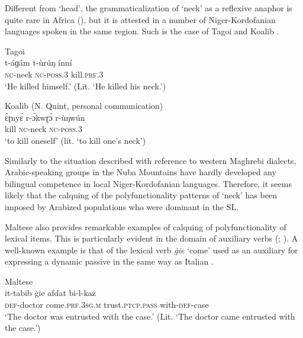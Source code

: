 \documentclass[output=paper]{langsci/langscibook}
\begin{document}
Different from ‘head’, the grammaticalization of ‘neck’ as a reflexive anaphor is quite rare in Africa (\citealt[50]{Heine2011}), but it is attested in a number of Niger-Kordofanian languages spoken in the same region. Such is the case of Tagoi  and Koalib . 

\ea\label{21}
{Tagoi \citep[26]{Alamin2015}}\\
\gll   t-áɡám t-ùrúŋ ínní\\
       \textsc{nc}-neck \textsc{nc}-\textsc{poss.3} kill.\textsc{prf.3}\\
\glt   `He killed himself.' (Lit. ‘He killed his neck.’)
\z

\ea\label{22}
{Koalib (N. Quint, personal communication)} \\
\gll   ɛ̀ɽnyɛ́ r-ɔ́kwɽɔ̀ r-ùŋwún\\
       kill \textsc{nc}-neck \textsc{nc-poss.3}\\
\glt   `to kill oneself' (lit. ‘to kill one's neck’)
\z

Similarly to the situation described with reference to western Maghrebi dialects, Arabic-speaking groups in the Nuba Mountains have hardly developed any bilingual competence in local Niger-Kordofanian languages. Therefore, it seems likely that the calquing of the polyfunctionality patterns of ‘neck’ has been imposed by Arabized populations who were dominant in the SL. 

Maltese also provides remarkable examples of calquing of polyfunctionality of lexical items. This is particularly evident in the domain of auxiliary verbs (\citealt{Vanhove1993}; \citealt{VanhoveCaubet2009}). A well-known example is that of the lexical verb \textit{\.gie} ‘come’ used as an auxiliary for expressing a dynamic passive  in the same way as Italian .

\ea\label{23}
{Maltese \citep[214]{BorgAzzopardi-Alexander1997}}\\
\gll   it-tabib \.gie afdat bi-l-każ\\
       \textsc{def}-doctor come.\textsc{prf.3sg.m} trust.\textsc{ptcp.pass} with-\textsc{def}-case\\
\glt   `The doctor was entrusted with the case.' (Lit. ‘The doctor came entrusted with the case.’)
\z

\end{document}
